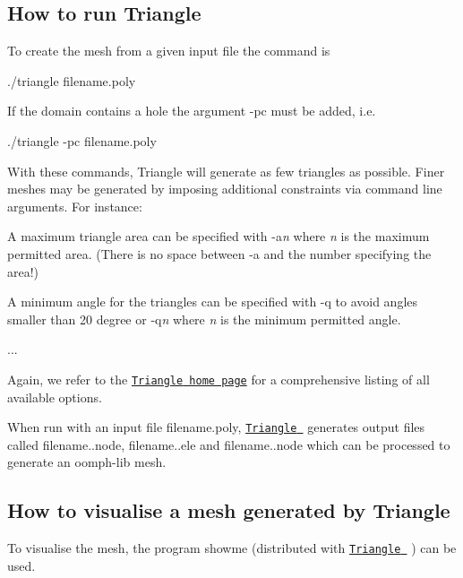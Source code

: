 \hypertarget{index_run_triangle}{}\subsection{How to run Triangle}\label{index_run_triangle}
To create the mesh from a given input file the command is


\begin{DoxyCode}
./triangle filename.poly
\end{DoxyCode}


If the domain contains a hole the argument {\ttfamily -\/pc} must be added, i.\+e.


\begin{DoxyCode}
./triangle -pc filename.poly 
\end{DoxyCode}


With these commands, {\ttfamily Triangle} will generate as few triangles as possible. Finer meshes may be generated by imposing additional constraints via command line arguments. For instance\+:
\begin{DoxyItemize}
\item A maximum triangle area can be specified with {\ttfamily -\/a}{\itshape n} where {\itshape n} is the maximum permitted area. (There is no space between {\ttfamily -\/a} and the number specifying the area!)
\item A minimum angle for the triangles can be specified with {\ttfamily -\/q} to avoid angles smaller than 20 degree or {\ttfamily -\/q}{\itshape n} where {\itshape n} is the minimum permitted angle.
\item ...
\end{DoxyItemize}Again, we refer to the \href{http://www.cs.cmu.edu/~quake/triangle.html}{\tt {\ttfamily Triangle} home page} for a comprehensive listing of all available options.

When run with an input file {\ttfamily filename.\+poly}, \href{http://www.cs.cmu.edu/~quake/triangle.html}{\tt {\ttfamily Triangle} } generates output files called {\ttfamily filename..\+node}, {\ttfamily filename..\+ele} and {\ttfamily filename..\+node} which can be processed to generate an {\ttfamily oomph-\/lib} mesh.



\hypertarget{index_showme}{}\subsection{How to visualise a mesh generated by Triangle}\label{index_showme}
To visualise the mesh, the program {\ttfamily showme} (distributed with \href{http://www.cs.cmu.edu/~quake/triangle.html}{\tt {\ttfamily Triangle} } ) can be used.



